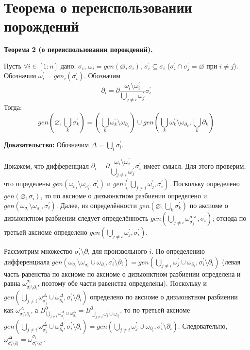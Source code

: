 \newpage
\section{Теорема о переиспользовании порождений}

\textbf{Теорема 2 (о переиспользовании порождений).}

Пусть $\forall i \in [1:n]$ дано: $\sigma_i$, $\omega_i = gen(\varnothing, \sigma_i)$, $\sigma_i^\prime \subseteq \sigma_i$ ($\sigma_i^\prime \cap \sigma_j^\prime = \varnothing$ при $i \neq j$). Обозначим $\omega_i^\prime = gen_i(\sigma_i^\prime)$. Обозначим 
$$\partial_i = \partial\dfrac{\omega_i \setminus \omega_i^\prime}{\bigcup\limits_{j \neq i} \omega_j^\prime} \sigma_i^\prime$$
Тогда:
$$gen(\varnothing, \bigcup\limits_k \sigma^\prime_k) = \left( \bigcup\limits_k \omega_k^\prime \setminus \omega_{\partial_k} \right) \cup gen(\bigcup\limits_k \omega_k^\prime \setminus \omega_{\partial_k}, \bigcup\limits_k \partial_k)$$

\newcommand{\sigi}{{\sigma_i}}
\newcommand{\sigpi}{{\sigma^\prime_i}}
\newcommand{\sigpj}{{\sigma^\prime_j}}
\newcommand{\parti}{{\partial_i}}
\newcommand{\alloth}{\bigcup\limits_{j \neq i}\omega^\prime_j}
\newcommand{\rprt}{{\text{п.ч.}}}

\textbf{Доказательство:}
Обозначим $\Delta = \bigcup\limits_i \sigma_i^\prime$.

Докажем, что дифференциал $\partial_i = \partial\dfrac{\omega_i \setminus \omega_i^\prime}{\bigcup\limits_{j \neq i} \omega_j^\prime} \sigma_i^\prime$ имеет смысл. Для этого проверим, что определены $gen(\omega_{\sigi} \setminus \omega_{\sigpi}, \sigpi)$ и $gen(\alloth, \sigpi)$. Поскольку определено $gen(\varnothing, \sigi)$, то по аксиоме о дизъюнктном разбиении определено и $gen(\omega_{\sigi} \setminus \omega_{\sigpi}, \sigpi)$. Далее, из определённости $gen(\varnothing, \bigcup\limits_k \sigma^\prime_k)$ по аксиоме о дизъюнктном разбиении следует определённость $gen(\bigcup\limits_{j \neq i}\omega^{\text{л.ч.}}_\sigpj, \sigpi)$; отсюда по третьей аксиоме определено $gen(\alloth, \sigpi)$.

Рассмотрим множество $\sigpi \setminus \parti$ для произвольного $i$. По определению дифференциала $gen(\omega_\sigi \setminus \omega_\sigpi \cup \omega_\parti, \sigpi\setminus\parti) = gen(\alloth \cup \omega_\parti, \sigpi\setminus\parti)$ (левая часть равенства по аксиоме по аксиоме о дизъюнктном разбиении определена и равна $\omega^\sigi_{\sigpi\setminus\parti}$, поэтому обе части равенства определены). Поскольку и $gen(\bigcup\limits_{j \neq i}\omega^\Delta_\sigpj \cup \omega^\Delta_\parti, \sigpi \setminus \parti)$ определено по аксиоме о дизъюнктном разбиении как $\omega^\Delta_{\sigpi\setminus\parti}$, а $B^0_{\bigcup\limits_{j \neq i}\omega^\Delta_\sigpj \cup \omega^\Delta_\parti} = B^0_{\alloth \cup \omega_\parti}$, то по третьей аксиоме $gen(\bigcup\limits_{j \neq i}\omega^\Delta_\sigpj \cup \omega^\Delta_\parti, \sigpi \setminus \parti) = gen(\alloth \cup \omega_\parti, \sigpi\setminus\parti)$. Следовательно, $\omega^\Delta_{\sigpi\setminus\parti} = \omega^\sigi_{\sigpi\setminus\parti}$.

